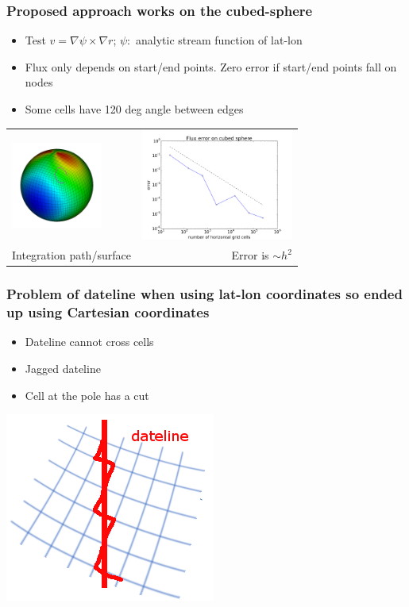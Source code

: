 \documentclass[aspectratio=169]{beamer}
\begin{document}
\begin{frame}[t]
  \frametitle{Proposed approach works on the cubed-sphere}
  \begin{block}{}
   \begin{itemize}
   \item Test $v = \nabla \psi \times \nabla r$; $\psi:$ analytic stream function of lat-lon
   \item Flux only depends on start/end points. Zero error if start/end points fall on nodes
   \item Some cells have 120 deg angle between edges
   \end{itemize}
  \end{block}
  
  \begin{tabular}{lr}
  \includegraphics[width=30mm]{fluxOnCubedSphere.png} & 
  \includegraphics[width=50mm]{cubedSphereFluxError.png} \\
  {Integration path/surface} & {Error is $\sim h^2$} 
  \end{tabular}
\end{frame}

\begin{frame}[t]
  \frametitle{Problem of dateline when using lat-lon coordinates so ended up using Cartesian coordinates}
  \begin{block}{}
   \begin{itemize}
   \item Dateline cannot cross cells
   \item Jagged dateline
   \item Cell at the pole has a cut
   \end{itemize}
  \end{block}
  \includegraphics[width=.3\linewidth]{datelineProblem.png}
\end{frame}
\end{document}
